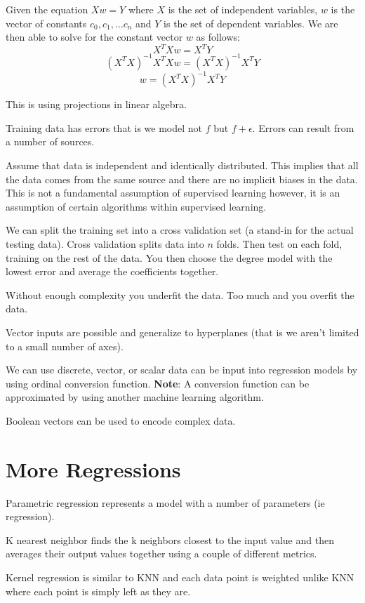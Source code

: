 \documentclass{article}
\begin{document}
Given the equation $Xw = Y$ where $X$ is the set of independent variables, $w$
is the vector of constants $c_0, c_1, \ldots c_n$ and $Y$ is the set of
dependent variables. We are then able to solve for the constant vector $w$ as
follows:
$$X^TXw  = X^TY$$
$$(X^TX)^{-1}X^TXw = (X^TX)^{-1}X^TY$$
$$w = (X^TX)^{-1}X^TY$$

This is using projections in linear algebra.

Training data has errors that is we model not $f$ but $f + \epsilon$. Errors can
result from a number of sources.

Assume that data is independent and identically distributed. This implies that
all the data comes from the same source and there are no implicit biases in
the data. This is not a fundamental assumption of supervised learning however,
it is an assumption of certain algorithms within supervised learning.

We can split the training set into a cross validation set (a stand-in for the
actual testing data). Cross validation splits data into $n$ folds. Then test on
each fold, training on the rest of the data. You then choose the degree model
with the lowest error and average the coefficients together.


Without enough complexity you underfit the data. Too much and you overfit the
data.

Vector inputs are possible and generalize to hyperplanes (that is we aren't
limited to a small number of axes).

We can use discrete, vector, or scalar data can be input into regression models
by using ordinal conversion function. \textbf{Note}: A conversion function can
be approximated by using another machine learning algorithm.

Boolean vectors can be used to encode complex data.

\section{More Regressions}

Parametric regression represents a model with a number of parameters (ie
regression).

K nearest neighbor finds the k neighbors closest to the input value and then
averages their output values together using a couple of different metrics.

Kernel regression is similar to KNN and each data point is weighted unlike KNN
where each point is simply left as they are.
\end{document}
